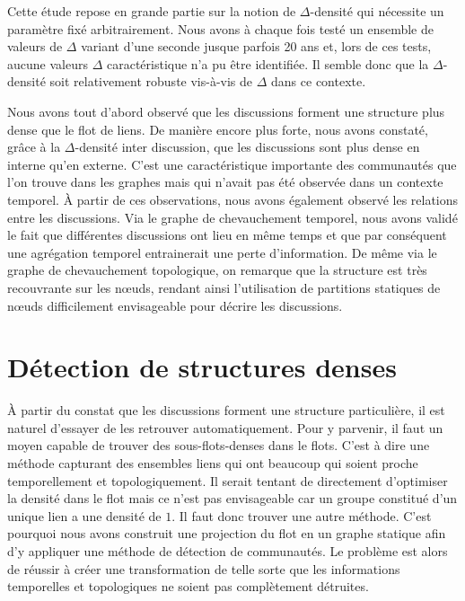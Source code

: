 Cette étude repose en grande partie sur la notion de $\Delta$-densité qui nécessite un paramètre fixé arbitrairement.
Nous avons à chaque fois testé un ensemble de valeurs de $\Delta$ variant d'une seconde jusque parfois 20 ans et, lors de ces tests, aucune valeurs $\Delta$ caractéristique n'a pu être identifiée.
Il semble donc que la $\Delta$-densité soit relativement robuste vis-à-vis de $\Delta$ dans ce contexte.

Nous avons tout d'abord observé que les discussions forment une structure plus dense que le flot de liens.
De manière encore plus forte, nous avons constaté, grâce à la  $\Delta$-densité inter discussion, que les discussions sont plus dense en interne qu'en externe.
C'est une caractéristique importante des communautés que l'on trouve dans les graphes mais qui n'avait pas été observée dans un contexte temporel.
\`A partir de ces observations, nous avons également observé les relations entre les discussions.
Via le graphe de chevauchement temporel, nous avons validé le fait que différentes discussions ont lieu en même temps et que par conséquent une agrégation temporel entrainerait une perte d'information.
De même via le graphe de chevauchement topologique, on remarque que la structure est très recouvrante sur les n\oe uds, rendant ainsi l'utilisation de partitions statiques de n\oe uds difficilement envisageable pour décrire les discussions.



\section{Détection de structures denses}

\`A partir du constat que les discussions forment une structure particulière, il est naturel d'essayer de les retrouver automatiquement. 
Pour y parvenir, il faut un moyen capable de trouver des sous-flots-denses dans le flots.
C'est à dire une méthode capturant des ensembles liens qui ont beaucoup qui soient proche temporellement et topologiquement.
Il serait tentant de directement d'optimiser la densité dans le flot mais ce n'est pas envisageable car un groupe constitué d'un unique lien a une densité de $1$.
Il faut donc trouver une autre méthode.
C'est pourquoi nous avons construit une projection du flot en un graphe statique afin d'y appliquer une méthode de détection de communautés.
Le problème est alors de réussir à créer une transformation de telle sorte que les informations temporelles et topologiques ne soient pas complètement détruites.

